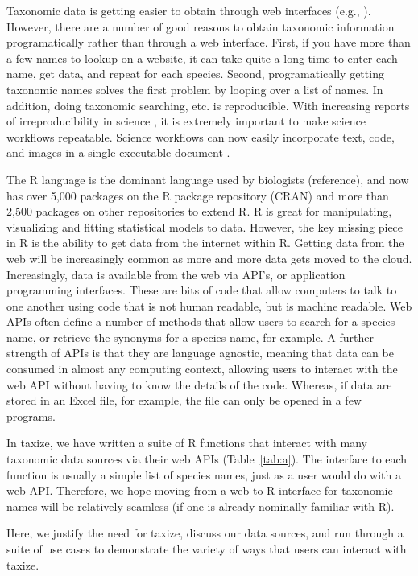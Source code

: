 \documentclass[letterpaper,superscriptaddress,showkeys,longbibliography,10pt]{revtex4-1}\usepackage{graphicx, color}
\begin{document}
Taxonomic data is getting easier to obtain through web interfaces (e.g., \cite{eol}). However, there are a number of good reasons to obtain taxonomic information programatically rather than through a web interface. First, if you have more than a few names to lookup on a website, it can take quite a long time to enter each name, get data, and repeat for each species. Second, programatically getting taxonomic names solves the first problem by looping over a list of names. In addition, doing taxonomic searching, etc. is reproducible. With increasing reports of irreproducibility in science \cite{stodden2010,zimmer2012}, it is extremely important to make science workflows repeatable. Science workflows can now easily incorporate text, code, and images in a single executable document \cite{yihui2013}. 

The R language is the dominant language used by biologists (reference), and now has over 5,000 packages on the R package repository (CRAN) and more than 2,500 packages on other repositories to extend R. R is great for manipulating, visualizing and fitting statistical models to data. However, the key missing piece in R is the ability to get data from the internet within R. Getting data from the web will be increasingly common as more and more data gets moved to the cloud. Increasingly, data is available from the web via API's, or application programming interfaces. These are bits of code that allow computers to talk to one another using code that is not human readable, but is machine readable. Web APIs often define a number of methods that allow users to search for a species name, or retrieve the synonyms for a species name, for example. A further strength of APIs is that they are language agnostic, meaning that data can be consumed in almost any computing context, allowing users to interact with the web API without having to know the details of the code. Whereas, if data are stored in an Excel file, for example, the file can only be opened in a few programs. 

In taxize, we have written a suite of R functions that interact with many taxonomic data sources via their web APIs (Table~\ref{tab:a}). The interface to each function is usually a simple list of species names, just as a user would do with a web API. Therefore, we hope moving from a web to R interface for taxonomic names will be relatively seamless (if one is already nominally familiar with R). 

Here, we justify the need for taxize, discuss our data sources, and run through a suite of use cases to demonstrate the variety of ways that users can interact with taxize. 
\end{document}
